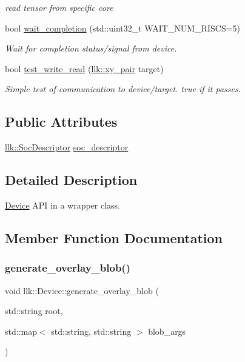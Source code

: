 \begin{DoxyCompactItemize}
\begin{DoxyCompactList}\small\item\em read tensor from specific core \end{DoxyCompactList}\item 
bool \hyperlink{classllk_1_1Device_a860d5ea1706c7fc693ed2f7da2de9874}{wait\+\_\+completion} (std\+::uint32\+\_\+t W\+A\+I\+T\+\_\+\+N\+U\+M\+\_\+\+R\+I\+S\+CS=5)
\begin{DoxyCompactList}\small\item\em Wait for completion status/signal from device. \end{DoxyCompactList}\item 
bool \hyperlink{classllk_1_1Device_a9086600f456bd20655b2bd74b8d10017}{test\+\_\+write\+\_\+read} (\hyperlink{structllk_1_1xy__pair}{llk\+::xy\+\_\+pair} target)
\begin{DoxyCompactList}\small\item\em Simple test of communication to device/target. true if it passes. \end{DoxyCompactList}\end{DoxyCompactItemize}
\subsection*{Public Attributes}
\begin{DoxyCompactItemize}
\item 
\hyperlink{structllk_1_1SocDescriptor}{llk\+::\+Soc\+Descriptor} \hyperlink{classllk_1_1Device_a00b7609fbc13977bb9ea6522c53feeb4}{soc\+\_\+descriptor}
\end{DoxyCompactItemize}


\subsection{Detailed Description}
\hyperlink{classllk_1_1Device}{Device} A\+PI in a wrapper class. 

\subsection{Member Function Documentation}
\mbox{\label{classllk_1_1Device_a15b42f2d1a734de7cd14b33a93bb87e2}} 
\subsubsection{\texorpdfstring{generate\+\_\+overlay\+\_\+blob()}{generate\_overlay\_blob()}}
{\footnotesize\ttfamily void llk\+::\+Device\+::generate\+\_\+overlay\+\_\+blob (\begin{DoxyParamCaption}\item[{std\+::string}]{root,  }\item[{std\+::map$<$ std\+::string, std\+::string $>$}]{blob\+\_\+args }\end{DoxyParamCaption})}



